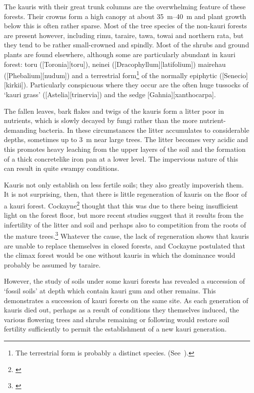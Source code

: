 The kauris with their great trunk columns are the overwhelming feature of these forests.
Their crowns form a high canopy at about \SIrange{35}{40}{\metre} and plant growth below this is often rather sparse.
Most of the tree species of the non-kauri forests are present however, including rimu, taraire, tawa, towai and northern rata, but they tend to be rather small-crowned and spindly.
Most of the shrubs and ground plants are found elsewhere, although some are particularly abundant in kauri forest: toru ([Toronia][toru]), neinei ([Dracophyllum][latifolium]) mairehau ([Phebalium][nudum]) and a terrestrial form\footnote{The terrestrial form is probably a distinct species. (See~\cite{eagle1982trees}).} of the normally epiphytic  ([Senecio][kirkii]).
Particularly conspicuous where they occur are the often huge tussocks of `kauri grass' ([Astelia][trinervia]) and the sedge [Gahnia][xanthocarpa].

The fallen leaves, bark flakes and twigs of the kauris form a litter poor in nutrients, which is slowly decayed by fungi rather than the more nutrient-demanding bacteria.
In these circumstances the litter accumulates to considerable depths, sometimes up to \SI{3}{\metre} near large trees.
The litter becomes very acidic and this promotes heavy leaching from the upper layers of the soil and the formation of a thick concretelike iron pan at a lower level.
The impervious nature of this can result in quite swampy conditions.

Kauris not only establish on less fertile soils; they also greatly impoverish them.
It is not surprising, then, that there is little regeneration of kauris on the floor of a kauri forest.
Cockayne\footnote{\cite{cockayne1928vegetation}} thought that this was due to there being insufficient light on the forest floor, but more recent studies suggest that it results from the infertility of the litter and soil and perhaps also to competition from the roots of the mature trees.\footnote{\cite{bieleski1959factors}}
Whatever the cause, the lack of regeneration shows that kauris are unable to replace themselves in closed forests, and Cockayne postulated that the climax forest would be one without kauris in which the dominance would probably be assumed by taraire.

However, the study of soils under some kauri forests has revealed a succession of `fossil soils' at depth which contain kauri gum and other remains.
This demonstrates a succession of kauri forests on the same site.
As each generation of kauris died out, perhaps as a result of conditions they themselves induced, the various flowering trees and shrubs remaining or following would restore soil fertility sufficiently to permit the establishment of a new kauri generation.

